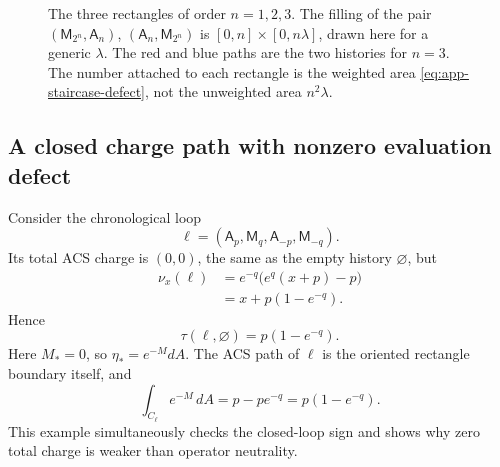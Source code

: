 \begin{figure}[htbp]
\centering
\caption{The three rectangles of order \(n=1,2,3\).  The filling of the pair
\((\mathsf M_{2^n},\mathsf A_n)\), \((\mathsf A_n,\mathsf M_{2^n})\) is
\([0,n]\times[0,n\lambda]\), drawn here for a generic \(\lambda\).  The red and
blue paths are the two histories for \(n=3\).  The number attached to each
rectangle is the weighted area \eqref{eq:app-staircase-defect}, not the
unweighted area \(n^{2}\lambda\).}
\label{fig:app-staircase-rectangles}
\end{figure}

\subsection{A closed charge path with nonzero evaluation defect}

Consider the chronological loop
\[
    \ell=(\mathsf A_p,\mathsf M_q,
           \mathsf A_{-p},\mathsf M_{-q}).
\]
Its total ACS charge is \((0,0)\), the same as the empty history
\(\varnothing\), but
\begin{align*}
    \nu_x(\ell)
      &=e^{-q}\bigl(e^q(x+p)-p\bigr)\\
      &=x+p(1-e^{-q}).
\end{align*}
Hence
\[
    \tau(\ell,\varnothing)=p(1-e^{-q}).
\]
Here \(M_*=0\), so \(\eta_*=e^{-M}dA\).  The ACS path of \(\ell\) is the
oriented rectangle boundary itself, and
\[
    \int_{C_\ell}e^{-M}\,dA
      =p-p e^{-q}
      =p(1-e^{-q}).
\]
This example simultaneously checks the closed-loop sign and shows why zero
total charge is weaker than operator neutrality.

